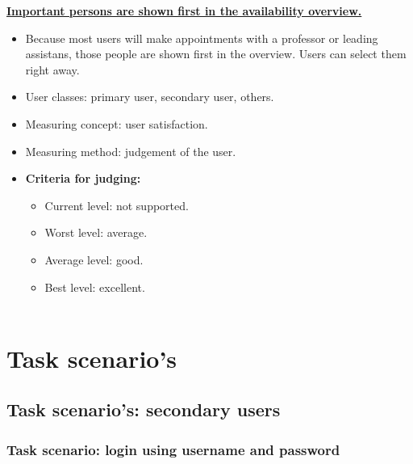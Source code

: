 \documentclass[11pt, a4paper,svglistings]{report}
\begin{document}
\textbf{\underline{Important persons are shown first in the availability overview.}}
\begin{itemize}
\item{Because most users will make appointments with a professor or leading assistans, those people are shown first in the overview. Users can select them right away.}
\item{User classes: primary user, secondary user, others.}
\item{Measuring concept: user satisfaction.}
\item{Measuring method: judgement of the user.}
\item{\textbf{Criteria for judging:}}
\begin{itemize}
\item{Current level: not supported.}
\item{Worst level: average.}
\item{Average level: good.}
\item{Best level: excellent. \\ \\}
\end{itemize}
\end{itemize}



\chapter{Task scenario's}

\section{Task scenario's: secondary users}

\subsection{\label{subsec:loginPass}Task scenario: login using username and password}
\end{document}
